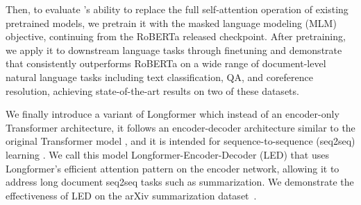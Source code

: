 Then, to evaluate \model's ability to replace the full self-attention operation of existing pretrained models, we pretrain
it with the masked language modeling (MLM) objective, continuing from the RoBERTa \cite{roberta} released checkpoint.
After pretraining, we apply it to downstream language tasks through finetuning and demonstrate that \model consistently outperforms RoBERTa on a wide range of document-level natural language tasks including text classification, QA, and coreference resolution, achieving state-of-the-art results on two of these datasets.

We finally introduce a variant of Longformer which instead of an encoder-only Transformer architecture, it follows an encoder-decoder architecture similar to the original Transformer model \cite{Vaswani2017AttentionIA}, and it is intended for sequence-to-sequence (seq2seq) learning \cite{Sutskever2014SequenceTS}. We call this model Longformer-Encoder-Decoder (LED) that uses Longformer's efficient attention pattern on the encoder network, allowing it to address long document seq2seq tasks such as summarization. We demonstrate the effectiveness of LED on the arXiv summarization dataset~\cite{arxiv2018}.




